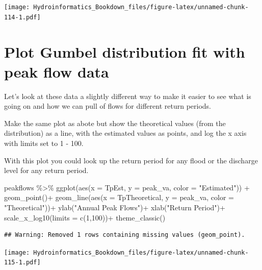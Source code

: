 \documentclass[
]{book}
\newenvironment{Shaded}{\begin{snugshade}}{\end{snugshade}}
\newcommand{\AttributeTok}[1]{\textcolor[rgb]{0.77,0.63,0.00}{#1}}
\newcommand{\DecValTok}[1]{\textcolor[rgb]{0.00,0.00,0.81}{#1}}
\newcommand{\FunctionTok}[1]{\textcolor[rgb]{0.00,0.00,0.00}{#1}}
\newcommand{\NormalTok}[1]{#1}
\newcommand{\SpecialCharTok}[1]{\textcolor[rgb]{0.00,0.00,0.00}{#1}}
\newcommand{\StringTok}[1]{\textcolor[rgb]{0.31,0.60,0.02}{#1}}
\begin{document}
\texttt{[image: Hydroinformatics\_Bookdown\_files/figure-latex/unnamed-chunk-114-1.pdf]}

\hypertarget{plot-gumbel-distribution-fit-with-peak-flow-data}{%
\section{Plot Gumbel distribution fit with peak flow data}\label{plot-gumbel-distribution-fit-with-peak-flow-data}}

Let's look at these data a slightly different way to make it easier to see what is going on and how we can pull of flows for different return periods.

Make the same plot as abote but show the theoretical values (from the distribution) as a line, with the estimated values as points, and log the x axis with limits set to 1 - 100.

With this plot you could look up the return period for any flood or the discharge level for any return period.

\begin{Shaded}
\begin{Highlighting}[]
\NormalTok{peakflows }\SpecialCharTok{\%\textgreater{}\%} \FunctionTok{ggplot}\NormalTok{(}\FunctionTok{aes}\NormalTok{(}\AttributeTok{x =}\NormalTok{ TpEst, }\AttributeTok{y =}\NormalTok{ peak\_va, }\AttributeTok{color =} \StringTok{"Estimated"}\NormalTok{)) }\SpecialCharTok{+}
  \FunctionTok{geom\_point}\NormalTok{()}\SpecialCharTok{+}
  \FunctionTok{geom\_line}\NormalTok{(}\FunctionTok{aes}\NormalTok{(}\AttributeTok{x =}\NormalTok{ TpTheoretical, }\AttributeTok{y =}\NormalTok{ peak\_va, }\AttributeTok{color =} \StringTok{"Theoretical"}\NormalTok{))}\SpecialCharTok{+}
  \FunctionTok{ylab}\NormalTok{(}\StringTok{"Annual Peak Flows"}\NormalTok{)}\SpecialCharTok{+}
  \FunctionTok{xlab}\NormalTok{(}\StringTok{"Return Period"}\NormalTok{)}\SpecialCharTok{+}
  \FunctionTok{scale\_x\_log10}\NormalTok{(}\AttributeTok{limits =} \FunctionTok{c}\NormalTok{(}\DecValTok{1}\NormalTok{,}\DecValTok{100}\NormalTok{))}\SpecialCharTok{+}
  \FunctionTok{theme\_classic}\NormalTok{()}
\end{Highlighting}
\end{Shaded}

\begin{verbatim}
## Warning: Removed 1 rows containing missing values (geom_point).
\end{verbatim}

\texttt{[image: Hydroinformatics\_Bookdown\_files/figure-latex/unnamed-chunk-115-1.pdf]}
\end{document}
